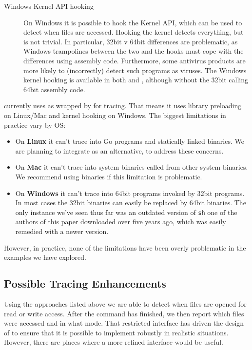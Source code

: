 \begin{description}
\item[Windows Kernel API hooking] On Windows it is possible to hook the Kernel API, which can be used to detect when files are accessed. Hooking the kernel detects everything, but is not trivial. In particular, 32bit v 64bit differences are problematic, as Windows trampolines between the two and the hooks must cope with the differences using assembly code. Furthermore, some antivirus products are more likely to (incorrectly) detect such programs as viruses. The Windows kernel hooking is available in both \Fsatrace and \libbigbro, although without the 32bit calling 64bit assembly code.
\end{description}

\Rattle currently uses \Fsatrace as wrapped by \Shake for tracing. That means it uses library preloading on Linux/Mac and kernel hooking on Windows. The biggest limitations in practice vary by OS:

\begin{itemize}
\item On \textbf{Linux} it can't trace into Go programs and statically linked binaries. We are planning to integrate \libbigbro as an alternative, to address these concerns.
\item On \textbf{Mac} it can't trace into system binaries called from other system binaries. We recommend using \Nix binaries if this limitation is problematic.
\item On \textbf{Windows} it can't trace into 64bit programs invoked by 32bit programs. In most cases the 32bit binaries can easily be replaced by 64bit binaries. The only instance we've seen thus far was an outdated version of \texttt{sh} one of the authors of this paper downloaded over five years ago, which was easily remedied with a newer version.
\end{itemize}

However, in practice, none of the limitations have been overly problematic in the examples we have explored.

\subsection{Possible Tracing Enhancements}

Using the approaches listed above we are able to detect when files are opened for read or write access. After the command has finished, we then report which files were accessed and in what mode. That restricted interface has driven the design of \Rattle to ensure that it is possible to implement \Rattle robustly in realistic situations. However, there are places where a more refined interface would be useful.

